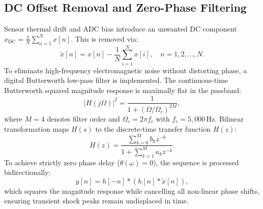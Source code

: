 \documentclass[conference,a4paper]{IEEEtran}
\begin{document}
\subsection{DC Offset Removal and Zero-Phase Filtering}
Sensor thermal drift and ADC bias introduce an unwanted DC component $x_{\text{DC}} = \frac{1}{N}\sum_{n=1}^{N} x[n]$. This is removed via:
\begin{equation}
    \tilde{x}[n] = x[n] - \frac{1}{N}\sum_{i=1}^{N} x[i], \quad n = 1, 2, \ldots, N.
    \label{eq:dc_removal}
\end{equation}
To eliminate high-frequency electromagnetic noise without distorting phase, a digital Butterworth low-pass filter is implemented. The continuous-time Butterworth squared magnitude response is maximally flat in the passband:
\begin{equation}
    |H(j\Omega)|^2 = \frac{1}{1 + (\Omega / \Omega_c)^{2M}},
    \label{eq:butterworth}
\end{equation}
where $M = 4$ denotes filter order and $\Omega_c = 2\pi f_c$ with $f_c = 5{,}000$\,Hz. Bilinear transformation maps $H(s)$ to the discrete-time transfer function $H(z)$:
\begin{equation}
    H(z) = \frac{\sum_{k=0}^{M} b_k z^{-k}}{1 + \sum_{k=1}^{M} a_k z^{-k}}.
    \label{eq:hz}
\end{equation}
To achieve strictly zero phase delay ($\theta(\omega) = 0$), the sequence is processed bidirectionally:
\begin{equation}
    y[n] = h[-n] * (h[n] * \tilde{x}[n]),
    \label{eq:filtfilt}
\end{equation}
which squares the magnitude response while cancelling all non-linear phase shifts, ensuring transient shock peaks remain undisplaced in time.
\end{document}
